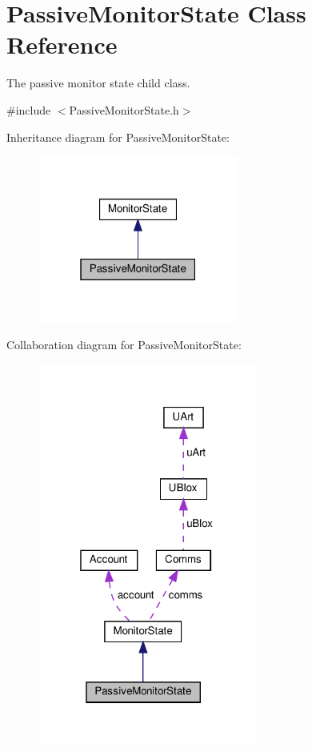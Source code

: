 \hypertarget{class_passive_monitor_state}{}\section{Passive\+Monitor\+State Class Reference}
\label{class_passive_monitor_state}


The passive monitor state child class.  




{\ttfamily \#include $<$Passive\+Monitor\+State.\+h$>$}



Inheritance diagram for Passive\+Monitor\+State\+:
\nopagebreak
\begin{figure}[H]
\begin{center}
\leavevmode
\includegraphics[width=187pt]{d2/d78/class_passive_monitor_state__inherit__graph}
\end{center}
\end{figure}


Collaboration diagram for Passive\+Monitor\+State\+:
\nopagebreak
\begin{figure}[H]
\begin{center}
\leavevmode
\includegraphics[width=205pt]{db/de8/class_passive_monitor_state__coll__graph}
\end{center}
\end{figure}
